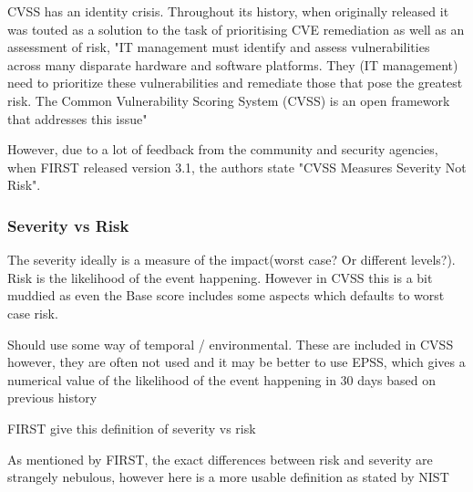\documentclass[12pt]{article}
\begin{document}
CVSS has an identity crisis. Throughout its history, when originally released it was touted as a
solution to the task of prioritising CVE remediation as well as an assessment of risk, "IT
management must identify and assess vulnerabilities across many disparate hardware and software
platforms. They (IT management) need to prioritize these vulnerabilities and remediate those that
pose the greatest risk. The Common Vulnerability Scoring System (CVSS) is an open framework that
addresses this issue"


However, due to a lot of feedback from the community and security agencies, when FIRST released
version 3.1, the authors state "CVSS Measures Severity Not Risk".

\subsubsection*{Severity vs Risk}

The severity ideally is a measure of the impact(worst case? Or different levels?). Risk is the
likelihood of the event happening. However in CVSS this is a bit muddied as even the Base score
includes some aspects which defaults to worst case risk.

Should use some way of temporal / environmental. These are included in CVSS however, they are often
not used and it may be better to use EPSS, which gives a numerical value of the likelihood of the
event happening in 30 days based on previous history

FIRST give this definition of severity vs risk
\textit{}


As mentioned by FIRST, the exact differences between risk and severity are strangely nebulous,
however here is a more usable definition as stated by NIST
\end{document}
